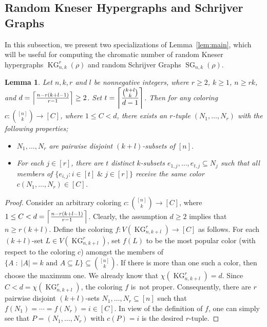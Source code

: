 \documentclass[11pt]{amsart}
\newtheorem{lemma}{Lemma}
\theoremstyle{definition}
\theoremstyle{remark}
\def\ds{\displaystyle}
\def\KG{\operatorname{KG}}
\def\SG{\operatorname{SG}}
\begin{document}
\subsection{\bf Random Kneser Hypergraphs and Schrijver Graphs}
In this subsection, we present two specializations of Lemma~\ref{lem:main}, which will be useful for computing the chromatic number of random Kneser hypergraphs $\KG^r_{n,k}(\rho)$ and random Schrijver Graphs $\SG_{n,k}(\rho)$.  
\begin{lemma}\label{lem:mainken}
Let $n, k, r$ and $l$ be nonnegative integers, where $r\geq 2$, $k\geq 1$,  $n\geq r k$, and 
$d= \left\lceil{n-r(k+l-1)\over r-1}\right\rceil\geq 2$.  
Set $t=\ds\left\lceil{{k+l\choose k}\over d-1}\right\rceil$. 
Then for any coloring  $c:{[n]\choose k}\longrightarrow [C]$, where 
$1\leq C<d$, there 
exists an $r$-tuple $(N_1,\ldots,N_r)$ with the following properties; 
\begin{itemize}
\item $N_1,\ldots,N_r$ are pairwise disjoint $(k+l)$-subsets of $[n]$.
\item For each $j\in[r]$, there are $t$ distinct $k$-subsets 
$e_{1,j},\ldots,e_{t,j}\subseteq N_j$  such that all members of  
$\{e_{i,j}:i\in[t]\;\&\; j\in[r]\}$ receive the same color $c(N_1,\ldots,N_r)\in[C]$.
\end{itemize}
\end{lemma} 
\begin{proof}
Consider an arbitrary coloring $c:{[n]\choose k}\longrightarrow [C]$, where 
$1\leq C<d=\left\lceil{n-r(k+l-1)\over r-1}\right\rceil$. 
Clearly, the assumption $d\geq 2$ implies that $n\geq r(k+l)$. 
Define the coloring $f:V(\KG^r_{n,k+l})\longrightarrow [C]$ as follows.  
For each $(k+l)$-set $L\in V(\KG^r_{n,k+l})$, set $f(L)$ to be the most popular
color (with respect to the coloring $c$) amongst the members of 
$\{A\;:\; |A|=k\mbox{ and } A\subseteq L\}\subseteq {[n]\choose k}$.  
If there is more than one such a color, then choose the maximum one. 
We already know that $\chi(\KG^r_{n,k+l})=d$.
Since $C< d=\chi(\KG^r_{n,k+l})$, the coloring $f$ is~not proper.
Consequently, there are $r$ pairwise disjoint $(k+l)$-sets $N_1,\ldots,N_r\subseteq [n]$ 
such that $f(N_1)=\cdots=f(N_r)=i\in [C]$. 
In view of the definition of $f$, one can simply see that
$P=(N_1,\ldots,N_r)$ with  $c(P)=i$ is the desired $r$-tuple.
\end{proof}
\end{document}
